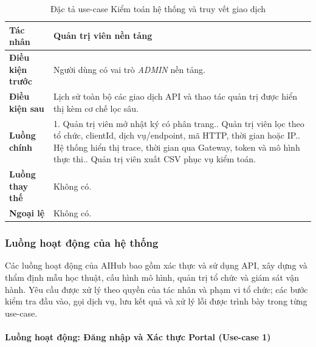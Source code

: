 \begingroup
\small
\begin{longtable}{|p{3.2cm}|p{\dimexpr\linewidth-3.2cm-4\tabcolsep-3\arrayrulewidth\relax}|}
\caption{Đặc tả use-case Kiểm toán hệ thống và truy vết giao dịch}
\label{aihub:tab:uc_system_audit_logs}\\
\hline
\textbf{Tác nhân} & Quản trị viên nền tảng \\ \hline
\textbf{Điều kiện trước} & Người dùng có vai trò \textit{ADMIN} nền tảng. \\ \hline
\textbf{Điều kiện sau} & Lịch sử toàn bộ các giao dịch API và thao tác quản trị được hiển thị kèm cơ chế lọc sâu. \\ \hline
\textbf{Luồng chính} & 1. Quản trị viên mở nhật ký có phân trang.\newline 2. Quản trị viên lọc theo tổ chức, clientId, dịch vụ/endpoint, mã HTTP, thời gian hoặc IP.\newline 3. Hệ thống hiển thị trace, thời gian qua Gateway, token và mô hình thực thi.\newline 4. Quản trị viên xuất CSV phục vụ kiểm toán. \\ \hline
\textbf{Luồng thay thế} & Không có. \\ \hline
\textbf{Ngoại lệ} & Không có. \\ \hline
\end{longtable}
\endgroup


\subsubsection{Luồng hoạt động của hệ thống}
\label{aihub:subsubsec:aihub_operational_flows}

Các luồng hoạt động của AIHub bao gồm xác thực và sử dụng API, xây dựng và thẩm định mẫu học thuật, cấu hình mô hình, quản trị tổ chức và giám sát vận hành. Yêu cầu được xử lý theo quyền của tác nhân và phạm vi tổ chức; các bước kiểm tra đầu vào, gọi dịch vụ, lưu kết quả và xử lý lỗi được trình bày trong từng use-case.



\clearpage

\paragraph{Luồng hoạt động: Đăng nhập và Xác thực Portal (Use-case 1)}

